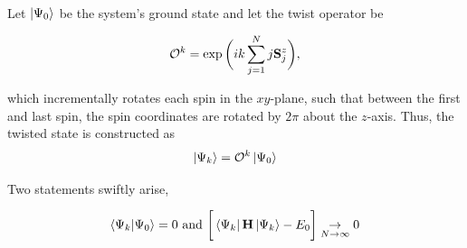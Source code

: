 \documentclass{homework}
\begin{document}
\blanky \\

Let $\ket{\Psi_0}$ be the system's ground state and let the twist operator be 

$$
    \mathcal{O}^k = \exp \bigg(ik \sum_{j=1}^{N} j {\bf S}_j^z\bigg),
$$

which incrementally rotates each spin in the $xy$-plane, such that between the first and last spin, the spin coordinates are rotated by $2\pi$ about the $z$-axis. Thus, the twisted state is constructed as 
$$
    \ket{\Psi_k} = \mathcal{O}^k \ket{\Psi_0}
$$

Two statements swiftly arise, 

\begin{lemma}
\label{HH_1_dimensional_twisted_state}
   \begin{equation}
       \bra{\Psi_k} \ket{\Psi_0} = 0 \textnormal{ and } \bigg[\bra{\Psi_k} {{\bf H}} \ket{\Psi_k} - E_0\bigg] \underset{N \rightarrow \infty}{\rightarrow} 0
 \end{equation}
\end{lemma}
\end{document}
